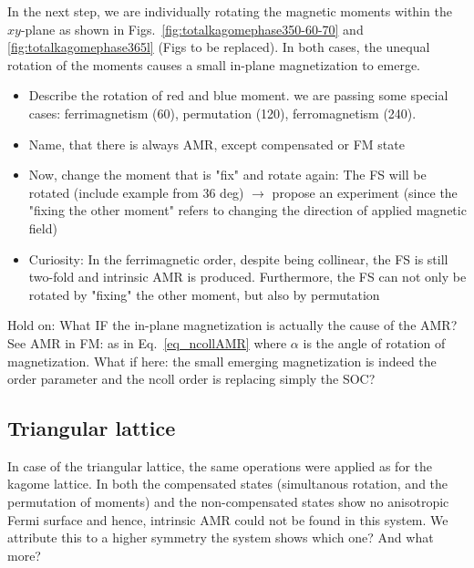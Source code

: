 \documentclass[prb,showpacs,amsmath,amssymb,superscriptaddress,twocolumn,floatfix]{revtex4-1}
\begin{document}
In the next step, we are individually rotating the magnetic moments within the $xy$-plane as shown in Figs.~\ref{fig:totalkagomephase350-60-70} and \ref{fig:totalkagomephase365l} {\color{red} (Figs to be replaced)}. In both cases, the unequal rotation of the moments causes a small in-plane magnetization to emerge.

{\color{red} \begin{itemize}
	\item Describe the rotation of red and blue moment. we are passing some special cases: ferrimagnetism (60), permutation (120), ferromagnetism (240). 
	\item Name, that there is always AMR, except compensated or FM state
	\item Now, change the moment that is "fix" and rotate again: The FS will be rotated (include example from 36 deg) $\rightarrow$ propose an experiment (since the "fixing the other moment" refers to changing the direction of applied magnetic field)
	\item Curiosity: In the ferrimagnetic order, despite being collinear, the FS is still two-fold and intrinsic AMR is produced. Furthermore, the FS can not only be rotated by "fixing" the other moment, but also by permutation
\end{itemize} }

{\color{red} Hold on: What IF the in-plane magnetization is actually the cause of the AMR? See AMR in FM: as in Eq.~\ref{eq_ncollAMR} where $\alpha$ is the angle of rotation of magnetization. What if here: the small emerging magnetization is indeed the order parameter and the ncoll order is replacing simply the SOC?}

\subsection{Triangular lattice}
In case of the triangular lattice, the same operations were applied as for the kagome lattice. In both the compensated states (simultanous rotation, and the permutation of moments) and the non-compensated states show no anisotropic Fermi surface and hence, intrinsic AMR could not be found in this system. We attribute this to a higher symmetry the system shows {\color{red} which one? And what more?}
\end{document}
